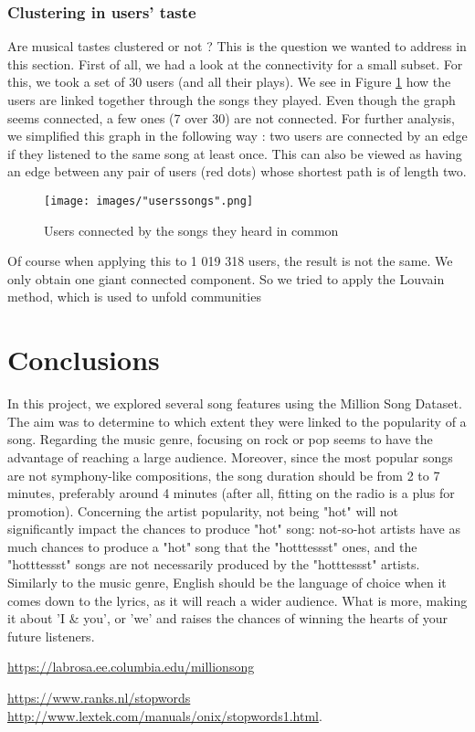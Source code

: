 \documentclass[10pt]{article}
\renewcommand\_{\textunderscore\allowbreak}
\begin{document}
\subsubsection{Clustering in users' taste}
Are musical tastes clustered or not ? This is the question we wanted to address in this section. First of all, we had a look at the connectivity for a small subset. For this, we took a set of 30 users (and all their plays). We see in Figure \ref{fig:user_connected_by_song} how the users are linked together through the songs they played. Even though the graph seems connected, a few ones (7 over 30) are not connected. For further analysis, we simplified this graph in the following way : two users are connected by an edge if they listened to the same song at least once. This can also be viewed as having an edge between any pair of users (red dots) whose shortest path is of length two. 

\begin{figure}[h!]
\centering
\captionsetup{width=0.8\textwidth}
\texttt{[image: images/"users\_songs\_1".png]}
\caption{Users connected by the songs they heard in common}
\label{fig:user_connected_by_song}
\end{figure}

Of course when applying this to 1 019 318 users, the result is not the same. We only obtain one giant connected component. So we tried to apply the Louvain method, which is used to unfold communities 

\section{Conclusions}
In this project, we explored several song features using the Million Song Dataset. The aim was to determine to which extent they were linked to the popularity of a song.
Regarding the music genre, focusing on rock or pop seems to have the advantage of reaching a large audience.
Moreover, since the most popular songs are not symphony-like compositions, the song duration should be from 2 to 7 minutes, preferably around 4 minutes (after all, fitting on the radio is a plus for promotion).
Concerning the artist popularity, not being "hot" will not significantly impact the chances to produce "hot" song: not-so-hot artists have as much chances to produce a "hot" song that the "hotttessst" ones, and the "hotttessst" songs are not necessarily produced by the "hotttessst" artists.
Similarly to the music genre, English should be the language of choice when it comes down to the lyrics, as it will reach a wider audience. What is more, making it about 'I \& you', or 'we' and raises the chances of winning the hearts of your future listeners.

\newpage
\begin{thebibliography}{}
\url{https://labrosa.ee.columbia.edu/millionsong}

\url{https://www.ranks.nl/stopwords}\\
\url{http://www.lextek.com/manuals/onix/stopwords1.html}.


\end{thebibliography}
\end{document}
